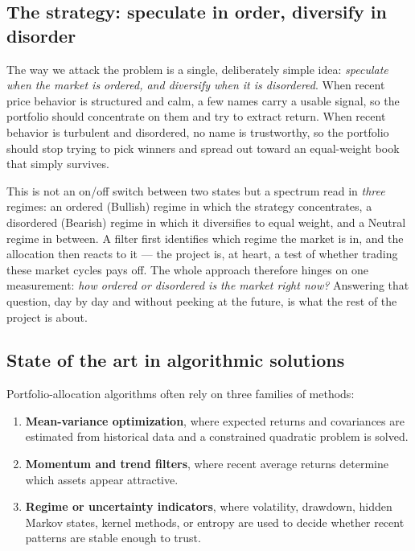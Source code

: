 \documentclass[a4paper,12pt]{article}
\begin{document}
\subsection{The strategy: speculate in order, diversify in disorder}

The way we attack the problem is a single, deliberately simple idea: \emph{speculate when the market is ordered, and diversify when it is disordered}. When recent price behavior is structured and calm, a few names carry a usable signal, so the portfolio should concentrate on them and try to extract return. When recent behavior is turbulent and disordered, no name is trustworthy, so the portfolio should stop trying to pick winners and spread out toward an equal-weight book that simply survives.

This is not an on/off switch between two states but a spectrum read in \emph{three} regimes: an ordered (Bullish) regime in which the strategy concentrates, a disordered (Bearish) regime in which it diversifies to equal weight, and a Neutral regime in between. A filter first identifies which regime the market is in, and the allocation then reacts to it --- the project is, at heart, a test of whether trading these market cycles pays off. The whole approach therefore hinges on one measurement: \emph{how ordered or disordered is the market right now?} Answering that question, day by day and without peeking at the future, is what the rest of the project is about.

\subsection{State of the art in algorithmic solutions}

Portfolio-allocation algorithms often rely on three families of methods:
\begin{enumerate}[label=\arabic*.]
    \item \textbf{Mean-variance optimization}, where expected returns and covariances are estimated from historical data and a constrained quadratic problem is solved.
    \item \textbf{Momentum and trend filters}, where recent average returns determine which assets appear attractive.
    \item \textbf{Regime or uncertainty indicators}, where volatility, drawdown, hidden Markov states, kernel methods, or entropy are used to decide whether recent patterns are stable enough to trust.
\end{enumerate}
\end{document}
